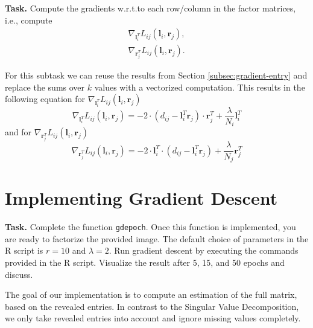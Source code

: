 \documentclass{support/acm_proc_article-sp}
\begin{document}
    \textbf{Task.} Compute the gradients w.r.t.\@ to each row/column in the factor matrices,
    i.e.\@, compute
    \begin{equation*}
        \begin{aligned}
            \nabla_{\mathbf{l}_i^T}L_{ij}(\mathbf{l}_i,\mathbf{r}_j),\\
            \nabla_{\mathbf{r}_j^T}L_{ij}(\mathbf{l}_i,\mathbf{r}_j).
        \end{aligned}
    \end{equation*}

    For this subtask we can reuse the results from Section \ref{subsec:gradient-entry} and replace the sums over
    $k$ values with a vectorized computation.
    This results in the following equation for $\nabla_{\mathbf{l}_i^T}L_{ij}(\mathbf{l}_i,\mathbf{r}_j)$
    \begin{equation*}
        \nabla_{\mathbf{l}_i^T}L_{ij}(\mathbf{l}_i,\mathbf{r}_j) =
        -2\cdot(d_{ij} - \mathbf{l}_i^T \mathbf{r}_j) \cdot \mathbf{r}_j^T
        + \frac{\lambda}{N_i} \mathbf{l}_i^T
    \end{equation*}
    and for $\nabla_{\mathbf{r}_j^T}L_{ij}(\mathbf{l}_i,\mathbf{r}_j)$
    \begin{equation*}
        \nabla_{\mathbf{r}_j^T}L_{ij}(\mathbf{l}_i,\mathbf{r}_j) =
        -2\cdot\mathbf{l}_i^T\cdot(d_{ij} - \mathbf{l}_i^T \mathbf{r}_j)
        + \frac{\lambda}{N_j} \mathbf{r}_j^T
    \end{equation*}


    \section{Implementing Gradient Descent}

    \textbf{Task.} Complete the function \lstinline{gdepoch}.
    Once this function is implemented, you are ready to factorize the provided image.
    The default choice of parameters in the R script is $r = 10$ and $\lambda = 2$.
    Run gradient descent by executing the commands provided in the R script.
    Visualize the result after 5, 15, and 50 epochs and discuss.

    The goal of our implementation is to compute an estimation of the full matrix, based on the revealed entries.
    In contrast to the Singular Value Decomposition, we only take revealed entries into account and ignore
    missing values completely.
\end{document}
